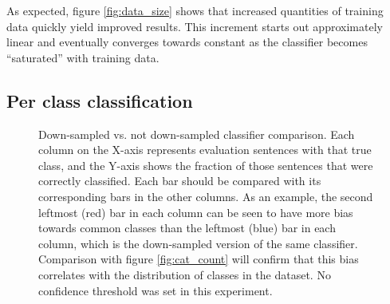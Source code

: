 \documentclass[a4paper,11pt]{kth-mag}
\begin{document}
As expected, figure \ref {fig:data_size} shows that increased quantities of training data quickly yield improved results. This increment starts out approximately linear and eventually converges towards constant as the classifier becomes ``saturated'' with training data. %

\pagebreak

\subsection{Per class classification}
\label{sec:per_cat}
\begin{figure}[h]
  \centering
  \caption{Down-sampled vs. not down-sampled classifier comparison. Each column on the X-axis represents evaluation sentences with that true class, and the Y-axis shows the fraction of those sentences that were correctly classified.
    Each bar should be compared with its corresponding bars in the other columns. As an example, the second leftmost (red) bar in each column can be seen to have more bias towards common classes than the leftmost (blue) bar in each column, which is the down-sampled version of the same classifier. Comparison with figure \ref{fig:cat_count} will confirm that this bias correlates with the distribution of classes in the dataset. No confidence threshold was set in this experiment.}
  \label{fig:per_cat}
\end{figure}
\end{document}
